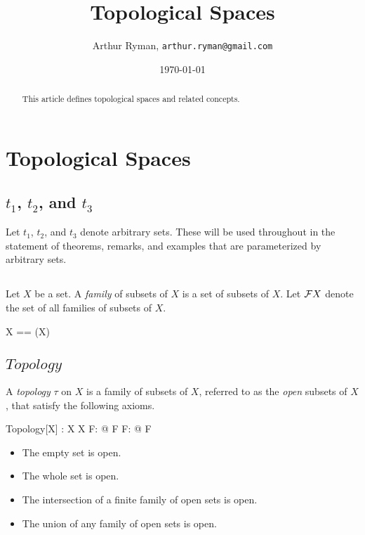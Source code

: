 \documentclass[11pt, oneside]{article}
\title{Topological Spaces}
\author{Arthur Ryman, {\tt arthur.ryman@gmail.com}}
\date{\today}
\begin{document}
\maketitle

\begin{abstract}
This article defines topological spaces and related concepts.
\end{abstract}

\section{Topological Spaces}

\subsection{$t_1$, $t_2$, and $t_3$}

Let $t_1$, $t_2$, and $t_3$ denote arbitrary sets.
These will be used throughout in the statement of theorems, remarks, and examples that are parameterized
by arbitrary sets.

\begin{zed}
	[t_1, t_2, t_3]
\end{zed}

\subsection{}

Let $X$ be a set.
A {\it family} of subsets of $X$ is a set of subsets of $X$.
Let $\mathcal{F} X$ denote the set of all families of subsets of $X$.

\begin{zed}
	\family X == \power(\power X)
\end{zed}

\subsection{$Topology$}

A {\it topology} $\tau$ on $X$ is a family of subsets of $X$, referred to as the {\it open} subsets of $X$, that satisfy the following axioms.

\begin{schema}{Topology}[X]
	\tau: \family X
\where
	\emptyset \in \tau
\also
	X \in \tau
\also
	\forall F: \finset \tau @ \bigcap F \in \tau
\also
	\forall F: \power \tau @ \bigcup F \in \tau
\end{schema}

\begin{itemize}
\item The empty set is open.
\item The whole set is open.
\item The intersection of a finite family of open sets is open.
\item The union of any family of open sets is open. 
\end{itemize}
\end{document}
